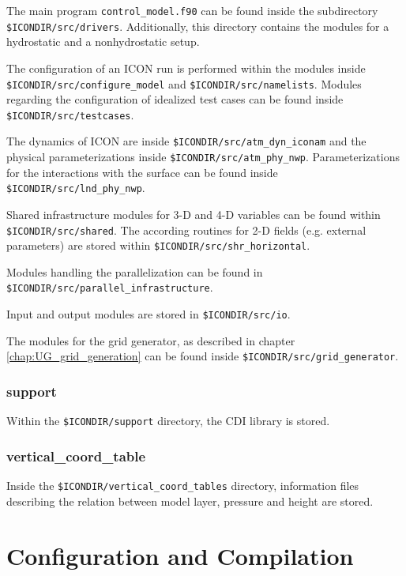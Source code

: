 The main program \verb+control_model.f90+ can be found inside the subdirectory \newline \verb+$ICONDIR/src/drivers+. Additionally, this directory contains the modules for a hydrostatic and a nonhydrostatic setup.

The configuration of an ICON run is performed within the modules inside \newline \verb+$ICONDIR/src/configure_model+ and \verb+$ICONDIR/src/namelists+. Modules regarding the configuration of idealized test cases can be found inside \verb+$ICONDIR/src/testcases+.

The dynamics of ICON are inside \verb+$ICONDIR/src/atm_dyn_iconam+ and the physical parameterizations inside \verb+$ICONDIR/src/atm_phy_nwp+. Parameterizations for the interactions with the surface can be found inside \verb+$ICONDIR/src/lnd_phy_nwp+.

Shared infrastructure modules for 3-D and 4-D variables can be found within \newline \verb+$ICONDIR/src/shared+. The according routines for 2-D fields (e.g. external parameters) are stored within \verb+$ICONDIR/src/shr_horizontal+.

Modules handling the parallelization can be found in \newline\verb+$ICONDIR/src/parallel_infrastructure+.

Input and output modules are stored in \verb+$ICONDIR/src/io+.

The modules for the grid generator, as described in chapter \ref{chap:UG_grid_generation} can be found inside \newline \verb+$ICONDIR/src/grid_generator+.

\subsubsection{support}

Within the \verb+$ICONDIR/support+ directory, the CDI library is stored. 

\subsubsection{vertical\_coord\_table}

Inside the \verb+$ICONDIR/vertical_coord_tables+ directory, information files describing the relation between model layer, pressure and height are stored.

\section{Configuration and Compilation}
\label{chap:UG_config_compil}

